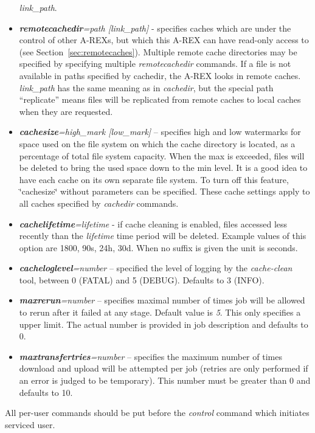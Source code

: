 \documentclass{article}                            %
\begin{document}
\begin{itemize}
  \emph{link\_path}.
\item \textbf{\textit{remotecachedir}}\textit{=path {[}link\_path]} -
  specifies caches which are under the control of other A-REXs, but which
  this A-REX can have read-only access to (see
  Section~\ref{sec:remotecaches}).  Multiple remote cache directories may be
  specified by specifying multiple \emph{remotecachedir} commands. If
  a file is not available in paths specified by cachedir, the A-REX looks
  in remote caches. \emph{link\_path} has the same meaning as in
  \emph{cachedir}, but the special path ``replicate'' means files will
  be replicated from remote caches to local caches when they are requested.
\item \textbf{\textit{cachesize}}\textit{=high\_mark {[}low\_mark]} --
  specifies high and low watermarks for space used on the file system
  on which the cache directory is located, as a percentage of total
  file system capacity. When the max is exceeded, files will be
  deleted to bring the used space down to the min level. It is a good
  idea to have each cache on its own separate file system. To turn off
  this feature, \char`\"{}cachesize\char`\"{} without parameters can
  be specified. These cache settings apply to all caches specified by
  \emph{cachedir} commands.
\item \textbf{\textit{cachelifetime}}\textit{=lifetime} - if cache
  cleaning is enabled, files accessed less recently than the
  \emph{lifetime} time period will be deleted. Example values of this
  option are 1800, 90s, 24h, 30d. When no suffix is given the unit is
  seconds.
\item \textbf{\textit{cacheloglevel}}\textit{=number} -- specified the
  level of logging by the \emph{cache-clean} tool, between 0 (FATAL)
  and 5 (DEBUG). Defaults to 3 (INFO).
\item \textbf{\textit{maxrerun}}\textit{=number} -- specifies maximal number
of times job will be allowed to rerun after it failed at any stage.
Default value is \emph{5}. This only specifies a upper limit. The actual
number is provided in job description and defaults to 0.
\item \textbf{\textit{maxtransfertries}}\textit{=number} -- specifies
  the maximum number of times download and upload will be attempted
  per job (retries are only performed if an error is judged to be
  temporary). This number must be greater than 0 and defaults to 10.
\end{itemize}

All per-user commands should be put before the \textit{control} command
which initiates serviced user.
\end{document}

